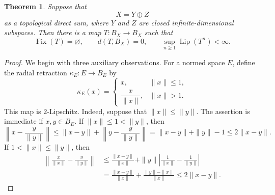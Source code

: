 \documentclass[11pt,reqno]{amsart}
\theoremstyle{plain}
\newtheorem{theorem}{Theorem}[section]
\theoremstyle{definition}
\begin{document}
\begin{theorem}
\label{thm:selected-decomposable-uniformly-lipschitz}
Suppose that
\begin{equation*}
 X=Y\oplus Z
\end{equation*}
as a topological direct sum, where $Y$ and $Z$ are closed infinite-dimensional subspaces. Then there is a map $T\colon B_X\to B_X$ such that
\begin{equation*}
 \operatorname{Fix}(T)=\varnothing,
 \qquad
 d(T,B_X)=0,
 \qquad
 \sup_{n\geq1}\operatorname{Lip}(T^n)<\infty.
\end{equation*}
\end{theorem}

\begin{proof}
We begin with three auxiliary observations. For a normed space $E$, define the radial retraction $\kappa_E\colon E\to B_E$ by
\begin{equation*}
 \kappa_E(x)=
 \begin{cases}
 x, & \|x\|\leq1,\\[1mm]
 \dfrac{x}{\|x\|}, & \|x\|>1.
 \end{cases}
\end{equation*}
This map is $2$-Lipschitz. Indeed, suppose that $\|x\|\leq\|y\|$. The assertion is immediate if $x,y\in B_E$. If $\|x\|\leq1<\|y\|$, then
\begin{equation*}
 \left\|x-\frac{y}{\|y\|}\right\|
 \leq \|x-y\|+\left\|y-\frac{y}{\|y\|}\right\|
 =\|x-y\|+\|y\|-1
 \leq2\|x-y\|.
\end{equation*}
If $1<\|x\|\leq\|y\|$, then
\begin{equation*}
\begin{aligned}
 \left\|\frac{x}{\|x\|}-\frac{y}{\|y\|}\right\|
 &\leq \frac{\|x-y\|}{\|x\|}
     +\|y\|\left|\frac1{\|x\|}-\frac1{\|y\|}\right|\\
 &=\frac{\|x-y\|}{\|x\|}
     +\frac{\|y\|-\|x\|}{\|x\|}
 \leq2\|x-y\|.
\end{aligned}
\end{equation*}


\end{proof}
\end{document}
